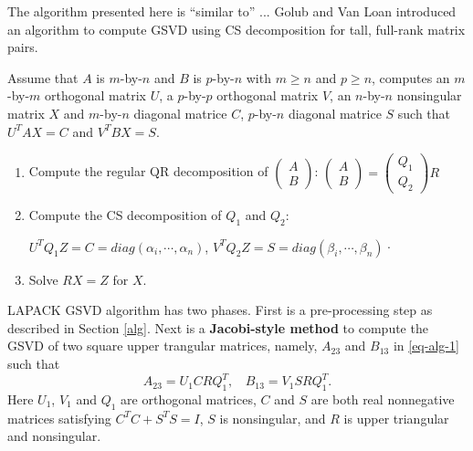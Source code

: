 \begin{remark}
{\rm The algorithm presented here is ``similar to'' ...  
Golub and Van Loan \cite[pp.~502--503]{golub2013matrix} 
introduced an algorithm to compute GSVD using CS decomposition for tall, full-rank matrix pairs.

Assume that $A$ is $m$-by-$n$ and $B$ is $p$-by-$n$ with $m \geq n$ and $p \geq n$, computes an $m$-by-$m$ orthogonal matrix $U$, a $p$-by-$p$ orthogonal matrix $V$, an $n$-by-$n$ nonsingular matrix $X$ and $m$-by-$n$ diagonal matrice $C$, $p$-by-$n$ diagonal matrice $S$ such that $U^{T}AX = C$ and $V^{T}BX = S$.
\begin{enumerate}
\item Compute the regular QR decomposition of $\begin{pmatrix} A\\ B\end{pmatrix}$:
        $\begin{pmatrix}
        A \\
        B
       \end{pmatrix}  = \begin{pmatrix}
        Q_1 \\
        Q_2
       \end{pmatrix}R$

       \item Compute the CS decomposition of $Q_1$ and $Q_2$:

        $U^{T}Q_1Z = C = diag(\alpha_i, \cdots, \alpha_n)$,
        $V^{T}Q_2Z = S = diag(\beta_i, \cdots, \beta_n)$·

        \item Solve $RX = Z$ for $X$.
    \end{enumerate}
}\end{remark} 

\begin{remark} 
{\rm 
LAPACK GSVD  algorithm \cite[pp.~51--53]{anderson1999lapack} has two phases.  First is a pre-processing step as described in Section \ref{alg}. 
Next is a {\bf Jacobi-style method} 
\cite{paige1986computing,bai1993computing} to compute the GSVD 
of two square upper trangular matrices, namely, 
$A_{23}$ and $B_{13}$ in \eqref{eq-alg-1} such that
\begin{equation} \label{eq-alg-jacobi}
A_{23} = U_1CRQ_1^{T},\ \ \ \ B_{13} = V_1SRQ_1^{T}.
\end{equation}
Here $U_1$, $V_1$ and $Q_1$ are orthogonal matrices, $C$ and $S$ are 
both real nonnegative matrices satisfying $C^TC + S^TS = I$, 
$S$ is nonsingular, and $R$ is upper triangular and nonsingular.
} \end{remark} 

